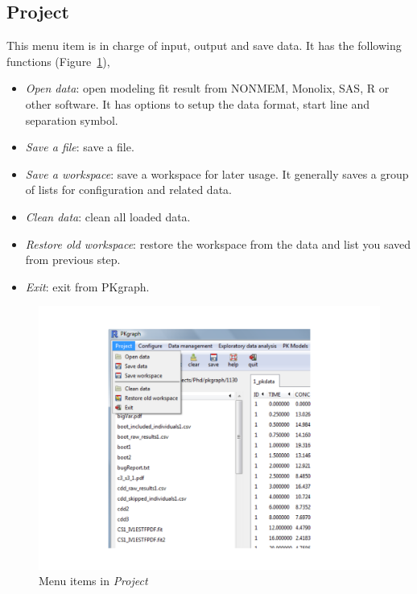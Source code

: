 \documentclass[a4paper]{article}
\begin{document}
\subsection{Project}
This menu item is in charge of input, output and save data. It has the following functions (Figure~\ref{project}),
\begin{itemize}
	\item \textit{Open data}: open modeling fit result from NONMEM, Monolix, SAS, R or other software.
  It has options to setup the data format, start line and separation symbol.
	\item \textit{Save a file}: save a file.
	\item \textit{Save a workspace}: save a workspace for later usage. It generally saves a group of lists
	for configuration and related data.
	\item \textit{Clean data}: clean all loaded data.		
	\item \textit{Restore old workspace}: restore the workspace from the data and list you saved from previous step.
	\item \textit{Exit}: exit from PKgraph.
\end{itemize}
\begin{figure}[h!tb] \centering
\includegraphics[scale=0.6]{project.pdf}
\caption{Menu items in \textit{Project}}
\label{project}
\end{figure}
\end{document}
